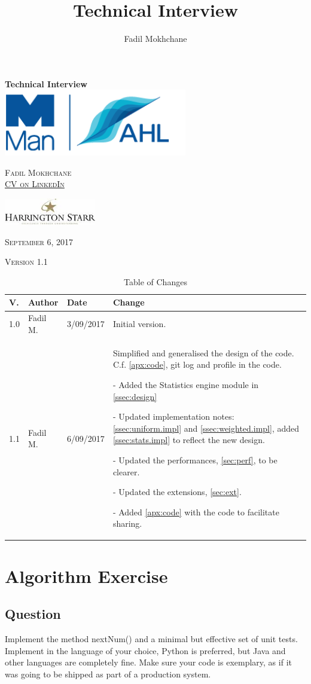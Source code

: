 \documentclass[12pt,a4paper,article]{memoir} %
\title{Technical Interview}
\author{Fadil Mokhchane}
\newlength\drop
\newcommand*\titleM{\begingroup%
\setlength\drop{0.08\textheight}
\centering
\vspace*{\drop}
{\Huge\bfseries Technical Interview}\\[\baselineskip]
\vfill
\includegraphics[width=0.6\textwidth]{img/logo.png}\par\vspace{1cm}
\vfill
{\Huge\scshape Fadil Mokhchane \\ 
\small \href{https://www.linkedin.com/in/fadil/}{CV on LinkedIn} }\par
\vspace{1cm}
\includegraphics[width=0.3\textwidth]{img/harrington.jpg}\par
\vfill
\vspace*{2\drop}
{\scshape September 6, 2017}\par
{\scshape \small Version 1.1}\par
\endgroup}
\begin{document}
\begin{titlingpage}
\titleM
\end{titlingpage}

\newpage
\tableofcontents* %
{}
\vfill


\begin{table}[h!]
  \centering
  \caption{Table of Changes}
  \begin{tabular}{lll p{}}
    \toprule
    V. & Author & Date & Change\\
    \midrule
    1.0 & Fadil M. & 3/09/2017 & 
    	Initial version. \\
    1.1 & Fadil M. & 6/09/2017 & 
    	Simplified and generalised the design of the code. 
    	C.f. \autoref{apx:code}, git log and profile in the code. 
    	
    	- Added the Statistics engine module in \autoref{ssec:design} 
    	
    	- Updated implementation notes: \autoref{ssec:uniform.impl}
    	 and \autoref{ssec:weighted.impl}, 
    	added \autoref{ssec:stats.impl} to reflect the new design.
    	
    	- Updated the performances, \autoref{sec:perf}, to be clearer.
    	
    	- Updated the extensions, \autoref{sec:ext}.
    	
    	- Added \autoref{apx:code} with the code to facilitate sharing.
    	\\
    \bottomrule
  \end{tabular}
\end{table}

\newpage
\listoffigures
\listoftables
\vfill
\newpage

\chapter{Algorithm Exercise}
\section{Question}
Implement the method nextNum() and a minimal but effective set of unit tests. 
Implement in the language of your choice, Python is preferred, but Java and 
other languages are completely fine. 
Make sure your code is exemplary, as if it was going to be shipped as part of a production system.
\end{document}
